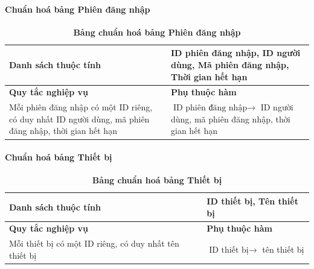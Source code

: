 \paragraph{Chuẩn hoá bảng Phiên đăng nhập}
\mbox{}

\begin{table}[H]
  \caption{\bfseries \fontsize{12pt}{0pt}\selectfont Bảng chuẩn hoá bảng Phiên đăng nhập}
  \centering
  \begin{tabularx}{0.9\textwidth}{|X|X|}
    \hline
    \textbf{Danh sách thuộc tính} & ID phiên đăng nhập, ID người dùng, Mã phiên đăng nhập, Thời
    gian hết hạn \\ %
    \hline
    \textbf{Quy tắc nghiệp vụ} & \textbf{Phụ thuộc hàm} \\
    \hline
    Mỗi phiên đăng nhập có một ID riêng, có duy nhất ID người dùng, mã phiên đăng nhập, thời
    gian hết hạn & \parbox[t]{\linewidth}{$\text{ID phiên đăng nhập} \rightarrow$ ID người dùng, mã phiên đăng nhập, thời
    gian hết hạn} \\
    \hline
     \\
     \\
    \hline
  \end{tabularx}
\end{table}



\paragraph{Chuẩn hoá bảng Thiết bị}
\mbox{}

\begin{table}[H]
  \caption{\bfseries \fontsize{12pt}{0pt}\selectfont Bảng chuẩn hoá bảng Thiết bị}
  \centering
  \begin{tabularx}{0.9\textwidth}{|X|X|}
    \hline
    \textbf{Danh sách thuộc tính} & ID thiết bị, Tên thiết bị \\ %
    \hline
    \textbf{Quy tắc nghiệp vụ} & \textbf{Phụ thuộc hàm} \\
    \hline
    Mỗi thiết bị có một ID riêng, có duy nhất tên thiết bị & \parbox[t]{\linewidth}{$\text{ID thiết bị} \rightarrow$ tên thiết bị} \\
    \hline
     \\
     \\
    \hline
  \end{tabularx}
\end{table}

